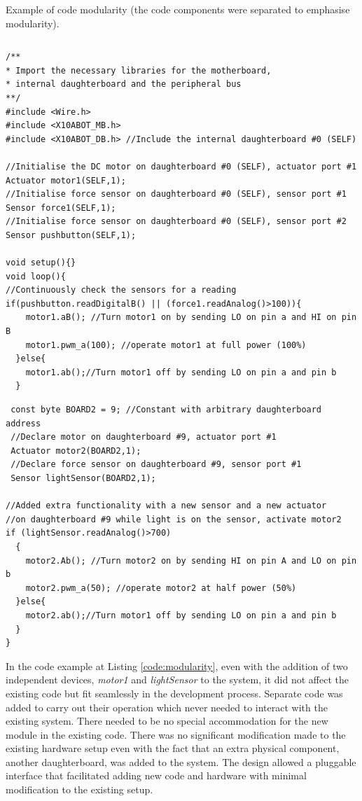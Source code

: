 \begin{listing}
		\footnotesize
		\caption{Example of code modularity (the code components were separated to emphasise modularity).} \label{code:modularity}
		\begin{verbatim}
        \end{verbatim}
        \begin{verbatim}
/**
* Import the necessary libraries for the motherboard, 
* internal daughterboard and the peripheral bus
**/
#include <Wire.h>  
#include <X10ABOT_MB.h>
#include <X10ABOT_DB.h> //Include the internal daughterboard #0 (SELF)

//Initialise the DC motor on daughterboard #0 (SELF), actuator port #1
Actuator motor1(SELF,1);
//Initialise force sensor on daughterboard #0 (SELF), sensor port #1
Sensor force1(SELF,1);
//Initialise force sensor on daughterboard #0 (SELF), sensor port #2
Sensor pushbutton(SELF,1);
   
void setup(){}
void loop(){
//Continuously check the sensors for a reading
if(pushbutton.readDigitalB() || (force1.readAnalog()>100)){
    motor1.aB(); //Turn motor1 on by sending LO on pin a and HI on pin B
    motor1.pwm_a(100); //operate motor1 at full power (100%) 
  }else{
    motor1.ab();//Turn motor1 off by sending LO on pin a and pin b
  }
 \end{verbatim}
 \begin{verbatim}
 const byte BOARD2 = 9; //Constant with arbitrary daughterboard address
 //Declare motor on daughterboard #9, actuator port #1
 Actuator motor2(BOARD2,1);
 //Declare force sensor on daughterboard #9, sensor port #1
 Sensor lightSensor(BOARD2,1);
 
//Added extra functionality with a new sensor and a new actuator
//on daughterboard #9 while light is on the sensor, activate motor2
if (lightSensor.readAnalog()>700)
  {
    motor2.Ab(); //Turn motor2 on by sending HI on pin A and LO on pin b
    motor2.pwm_a(50); //operate motor2 at half power (50%)
  }else{
    motor2.ab();//Turn motor1 off by sending LO on pin a and pin b
  }
}	 
	\end{verbatim}
		
\end{listing}
In the code example at Listing \ref{code:modularity}, even with the addition of two independent devices, \emph{motor1} and \emph{lightSensor} to the system, it did not affect the existing code but fit seamlessly in the development process. Separate code was added to carry out their operation which never needed to interact with the existing system. There needed to be no special accommodation for the new module in the existing code. There was no significant modification made to the existing hardware setup even with the fact that an extra physical component, another daughterboard, was added to the system. The \xten design allowed a pluggable interface that facilitated adding new code and hardware with minimal modification to the existing setup.
